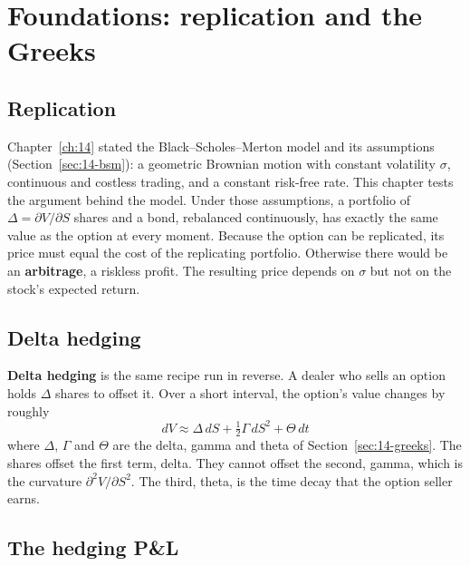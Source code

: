\section{Foundations: replication and the Greeks}
\label{sec:15-foundations}

\subsection{Replication}

Chapter~\ref{ch:14} stated the Black--Scholes--Merton model and its assumptions (Section~\ref{sec:14-bsm}): a geometric Brownian motion with constant volatility $\sigma$, continuous and costless trading, and a constant risk-free rate. This chapter tests the argument behind the model. Under those assumptions, a portfolio of $\Delta = \partial V/\partial S$ shares and a bond, rebalanced continuously, has exactly the same value as the option at every moment. Because the option can be replicated, its price must equal the cost of the replicating portfolio. Otherwise there would be an \textbf{arbitrage}, a riskless profit. The resulting price depends on $\sigma$ but not on the stock's expected return.

\subsection{Delta hedging}

\textbf{Delta hedging} is the same recipe run in reverse. A dealer who sells an option holds $\Delta$ shares to offset it. Over a short interval, the option's value changes by roughly
\begin{equation}
  dV \approx \Delta\,dS + \tfrac{1}{2}\Gamma\,dS^2 + \Theta\,dt
  \label{eq:15-taylor}
\end{equation}
where $\Delta$, $\Gamma$ and $\Theta$ are the delta, gamma and theta of Section~\ref{sec:14-greeks}. The shares offset the first term, delta. They cannot offset the second, gamma, which is the curvature $\partial^2 V/\partial S^2$. The third, theta, is the time decay that the option seller earns.

\subsection{The hedging P\&L}


